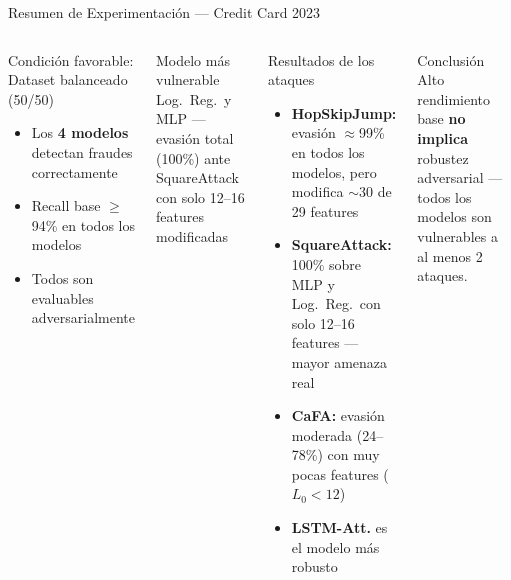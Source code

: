 \documentclass[aspectratio=169, 8pt]{beamer}
\begin{document}
\begin{frame}{Resumen de Experimentación — Credit Card 2023}
    \begin{columns}
        \begin{block}{Condición favorable: Dataset balanceado (50/50)}
            \begin{itemize}
                \item Los \textbf{4 modelos} detectan fraudes correctamente
                \item Recall base $\geq$ 94\% en todos los modelos
                \item Todos son evaluables adversarialmente
            \end{itemize}
        \end{block}

        \vspace{0.3cm}

        \begin{alertblock}{Modelo más vulnerable}
            Log.\ Reg.\ y MLP — evasión total (100\%)
            ante SquareAttack con solo 12--16 features modificadas
        \end{alertblock}

        \begin{block}{Resultados de los ataques}
            \begin{itemize}
                \item \textbf{HopSkipJump:} evasión $\approx$99\% en todos
                los modelos, pero modifica $\sim$30 de 29 features
                \item \textbf{SquareAttack:} 100\% sobre MLP y Log.\ Reg.\
                con solo 12--16 features — mayor amenaza real
                \item \textbf{CaFA:} evasión moderada (24--78\%)
                con muy pocas features ($L_0 < 12$)
                \item \textbf{LSTM-Att.} es el modelo más robusto
            \end{itemize}
        \end{block}

        \vspace{0.3cm}

        \begin{exampleblock}{Conclusión}
            Alto rendimiento base \textbf{no implica}
            robustez adversarial — todos los modelos
            son vulnerables a al menos 2 ataques.
        \end{exampleblock}
    \end{columns}
\end{frame}
\end{document}
